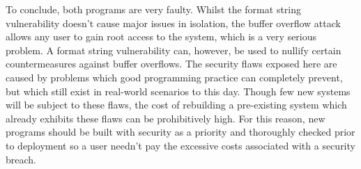To conclude, both programs are very faulty. Whilst the format string vulnerability doesn't cause major issues in
isolation, the buffer overflow attack allows any user to gain root access to the system, which is a very serious
problem. A format string vulnerability can, however, be used to nullify certain countermeasures against buffer
overflows. The security flaws exposed here are caused by problems which good programming practice can completely
prevent, but which still exist in real-world scenarios to this day. Though few new systems will be subject to these
flaws, the cost of rebuilding a pre-existing system which already exhibits these flaws can be prohibitively high. For
this reason, new programs should be built with security as a priority and thoroughly checked prior to deployment so a
user needn't pay the excessive costs associated with a security breach.
